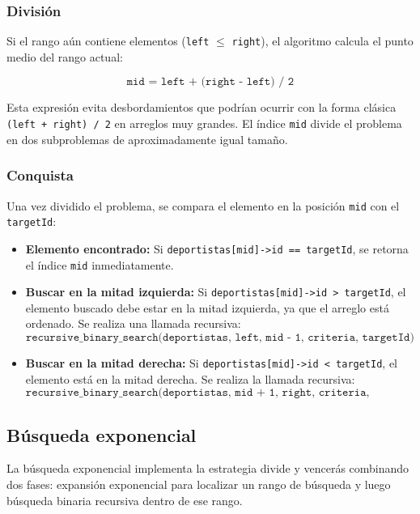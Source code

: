 \subsubsection{División}
Si el rango aún contiene elementos (\texttt{left} $\leq$ \texttt{right}), el algoritmo calcula el punto medio del rango actual:

\[
\texttt{mid = left + (right - left) / 2}
\]

Esta expresión evita desbordamientos que podrían ocurrir con la forma clásica \texttt{(left + right) / 2} en arreglos muy grandes. El índice \texttt{mid} divide el problema en dos subproblemas de aproximadamente igual tamaño.

\subsubsection{Conquista}
Una vez dividido el problema, se compara el elemento en la posición \texttt{mid} con el \texttt{targetId}:

\begin{itemize}
    \item \textbf{Elemento encontrado:} Si \texttt{deportistas[mid]->id == targetId}, se retorna el índice \texttt{mid} inmediatamente.
    
    \item \textbf{Buscar en la mitad izquierda:} Si \texttt{deportistas[mid]->id > targetId}, el elemento buscado debe estar en la mitad izquierda, ya que el arreglo está ordenado. Se realiza una llamada recursiva:
    \[
    \texttt{recursive\_binary\_search(deportistas, left, mid - 1, criteria, targetId)}
    \]
    
    \item \textbf{Buscar en la mitad derecha:} Si \texttt{deportistas[mid]->id < targetId}, el elemento está en la mitad derecha. Se realiza la llamada recursiva:
    \[
    \texttt{recursive\_binary\_search(deportistas, mid + 1, right, criteria, targetId)}
    \]
\end{itemize}

\subsection{Búsqueda exponencial}

La búsqueda exponencial implementa la estrategia divide y vencerás combinando dos fases: expansión exponencial para localizar un rango de búsqueda y luego búsqueda binaria recursiva dentro de ese rango.

